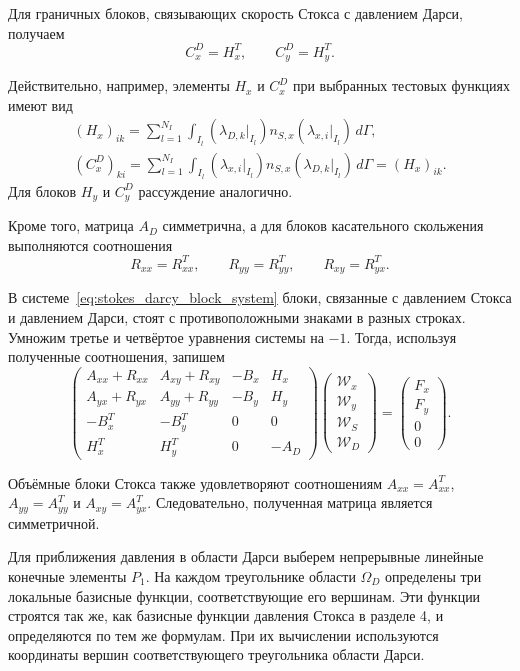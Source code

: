 \documentclass[a4paper,14pt]{extarticle}
\begin{document}
Для граничных блоков, связывающих скорость Стокса с
давлением Дарси, получаем
\begin{equation}
	C_x^D=H_x^T,
	\qquad
	C_y^D=H_y^T.
\end{equation}

Действительно, например, элементы $H_x$ и $C_x^D$
при выбранных тестовых функциях имеют вид
\begin{equation}
	\begin{gathered}
		(H_x)_{ik}
		=
		\sum_{l=1}^{N_I}
		\int_{I_l}
		\left(\lambda_{D,k}|_{I_l}\right)
		n_{S,x}
		\left(\lambda_{x,i}|_{I_l}\right)
		\,d\Gamma,
		\\[6pt]
		(C_x^D)_{ki}
		=
		\sum_{l=1}^{N_I}
		\int_{I_l}
		\left(\lambda_{x,i}|_{I_l}\right)
		n_{S,x}
		\left(\lambda_{D,k}|_{I_l}\right)
		\,d\Gamma
		=
		(H_x)_{ik}.
	\end{gathered}
\end{equation}
Для блоков $H_y$ и $C_y^D$ рассуждение аналогично.

Кроме того, матрица $A_D$ симметрична, а для блоков
касательного скольжения выполняются соотношения
\begin{equation}
	R_{xx}=R_{xx}^T,
	\qquad
	R_{yy}=R_{yy}^T,
	\qquad
	R_{xy}=R_{yx}^T.
\end{equation}


В системе~\eqref{eq:stokes_darcy_block_system} блоки,
связанные с давлением Стокса и давлением Дарси, стоят
с противоположными знаками в разных строках. Умножим
третье и четвёртое уравнения системы на $-1$. Тогда,
используя полученные соотношения, запишем
\begin{equation}
	\begin{pmatrix}
		A_{xx}+R_{xx} & A_{xy}+R_{xy} & -B_x & H_x\\
		A_{yx}+R_{yx} & A_{yy}+R_{yy} & -B_y & H_y\\
		-B_x^T & -B_y^T & 0 & 0\\
		H_x^T & H_y^T & 0 & -A_D
	\end{pmatrix}
	\begin{pmatrix}
		\mathcal W_x\\
		\mathcal W_y\\
		\mathcal W_S\\
		\mathcal W_D
	\end{pmatrix}
	=
	\begin{pmatrix}
		F_x\\
		F_y\\
		0\\
		0
	\end{pmatrix}.
\end{equation}

Объёмные блоки Стокса также удовлетворяют соотношениям
$A_{xx}=A_{xx}^T$, $A_{yy}=A_{yy}^T$ и
$A_{xy}=A_{yx}^T$. Следовательно, полученная матрица
является симметричной.

Для приближения давления в области Дарси выберем
непрерывные линейные конечные элементы $P_1$. На каждом
треугольнике области $\Omega_D$ определены три локальные
базисные функции, соответствующие его вершинам.
Эти функции строятся так же, как базисные функции давления
Стокса в разделе 4, и определяются по тем же формулам.
При их вычислении используются координаты вершин
соответствующего треугольника области Дарси.
\end{document}
